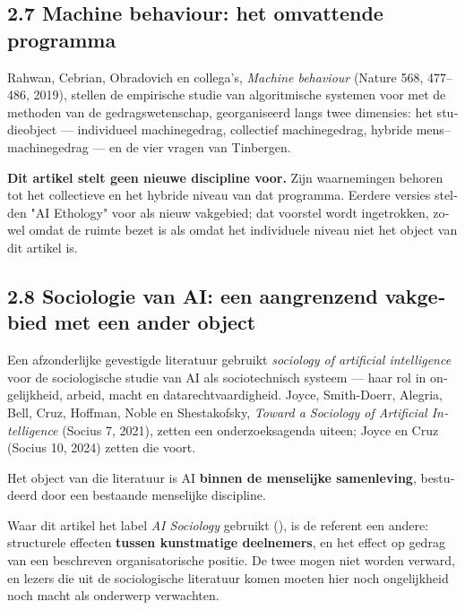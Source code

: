 \begin{dutch}
\subsection*{2.7 Machine behaviour: het omvattende programma}
\label{sec:nl:2.7}

\gcheck{} Rahwan, Cebrian, Obradovich en collega's, \emph{Machine behaviour} (Nature 568, 477–486, 2019), stellen de empirische studie van algoritmische systemen voor met de methoden van de gedragswetenschap, georganiseerd langs twee dimensies: het studieobject — individueel machinegedrag, collectief machinegedrag, hybride mens–machinegedrag — en de vier vragen van Tinbergen.

\textbf{Dit artikel stelt geen nieuwe discipline voor.} Zijn waarnemingen behoren tot het collectieve en het hybride niveau van dat programma. Eerdere versies stelden "AI Ethology" voor als nieuw vakgebied; dat voorstel wordt ingetrokken, zowel omdat de ruimte bezet is als omdat het individuele niveau niet het object van dit artikel is.


\subsection*{2.8 Sociologie van AI: een aangrenzend vakgebied met een ander object}
\label{sec:nl:2.8}

\gcheck{} Een afzonderlijke gevestigde literatuur gebruikt \emph{sociology of artificial intelligence} voor de sociologische studie van AI als sociotechnisch systeem — haar rol in ongelijkheid, arbeid, macht en datarechtvaardigheid. Joyce, Smith-Doerr, Alegria, Bell, Cruz, Hoffman, Noble en Shestakofsky, \emph{Toward a Sociology of Artificial Intelligence} (Socius 7, 2021), zetten een onderzoeksagenda uiteen; Joyce en Cruz (Socius 10, 2024) zetten die voort.

Het object van die literatuur is AI \textbf{binnen de menselijke samenleving}, bestudeerd door een bestaande menselijke discipline.

Waar dit artikel het label \emph{AI Sociology} gebruikt (), is de referent een andere: structurele effecten \textbf{tussen kunstmatige deelnemers}, en het effect op gedrag van een beschreven organisatorische positie. De twee mogen niet worden verward, en lezers die uit de sociologische literatuur komen moeten hier noch ongelijkheid noch macht als onderwerp verwachten.


\end{dutch}
